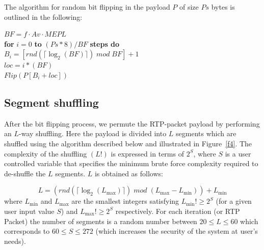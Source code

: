 \documentclass[preprint]{elsarticle}
\begin{document}
The algorithm for random bit flipping in the payload $P$ of size $Ps$ bytes is outlined in the following:

\noindent \hspace*{30mm} $BF= f \cdot Av \cdot MEPL$ \\
\hspace*{30mm} \textbf{for} $i=0$ \textbf{to} $(Ps \ast 8)/BF$ \textbf{steps do} \\
\hspace*{35mm} $B_{i}=\left[ rnd(  \lceil   \log_{2}(BF)  \rceil )\; mod\; BF   \right] +1 $ \\
\hspace*{35mm} $loc = i \ast (BF)$ \\
\hspace*{35mm} $Flip(P[B_{i} + loc])$ 


\subsection{Segment shuffling}

After the bit flipping process, we permute the RTP-packet payload by performing an $L$-way shuffling. Here the payload is divided into $L$ segments which are shuffled using the algorithm described below and illustrated in Figure~\ref{f4}. The complexity of the shuffling $(L!)$ is expressed in terms of $2^{S}$, where $S$ is a user controlled variable that specifies the minimum brute force complexity required to de-shuffle the $L$ segments. $L$ is obtained as follows:

\begin{equation}
L = (rnd (\lceil \log_{2}(L_{\max}) \rceil ) \;mod  \; (L_{\max} -L_{\min})) + L_{\min}
\label{ec8}
\end{equation}
where $L_{\min}$ and $L_{\max}$ are the smallest integers satisfying  $L_{\min}! \geq 2^{S}$ (for a given user input value $S$) and $L_{\max}! \geq 2^{S}$ respectively. For each iteration (or RTP Packet) the number of segments is a random number between $20 \leq L \leq 60$ which corresponds to $60 \leq S \leq 272$ (which increases the security of the system at user's needs).
\end{document}
